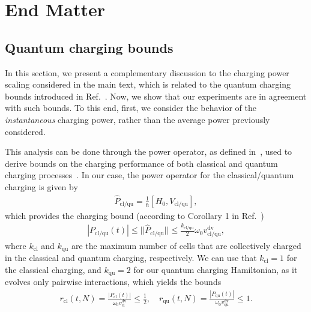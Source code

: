 \documentclass[aps,prl,epsfigure,twocolumn,superscriptaddress]{revtex4-2}
\newcommand{\1}{\mathbbm{1}}
\begin{document}
	\section*{End Matter}



	\subsection{Quantum charging bounds}

	In this section, we present a complementary discussion to the charging power scaling considered in the main text, which is related to the quantum charging bounds introduced in Ref.~\cite{Kim:22}. Now, we show that our experiments are in agreement with such bounds. To this end, first, we consider the behavior of the \textit{instantaneous} charging power, rather than the average power previously considered.

	This analysis can be done through the power operator, as defined in~\cite{Santos:20c}, used to derive bounds on the charging performance of both classical and quantum charging processes~\cite{Kim:22}. In our case, the power operator for the classical/quantum charging is given by
	\begin{align}
		\hat{P}_{\mathrm{cl}/\mathrm{qu}} = \frac{1}{\hbar} [H_{0},V_{\mathrm{cl}/\mathrm{qu}}]  ,
	\end{align}
	which provides the charging bound (according to Corollary 1 in Ref.~\cite{Kim:22})
	\begin{align}
		| P_{\mathrm{cl}/\mathrm{qu}} (t) | \leq ||\hat{P}_{\mathrm{cl}/\mathrm{qu}}|| \le \frac{k_{\mathrm{cl}/\mathrm{qu}}}{2} \omega_0 v^{ \text{dv}}_{\mathrm{cl}/\mathrm{qu}} , \label{Eq:Ineq}
	\end{align}
	where $k_{\mathrm{cl}}$ and $k_{\mathrm{qu}}$ are the maximum number of cells that are collectively charged in the classical and quantum charging, respectively. We can use that $k_{\mathrm{cl}}=1$ for the classical charging, and $k_{\mathrm{qu}}=2$ for our quantum charging Hamiltonian, as it evolves only pairwise interactions, which yields the bounds
	\begin{align}
		r_{\mathrm{cl}}(t,N) = \frac{| P_{\mathrm{cl}} (t) |}{ \omega_0 v^{ \text{dv}}_{\mathrm{cl}}} \leq \frac{1}{2} ,
		\quad
		r_{\mathrm{qu}}(t,N) =  \frac{| P_{\mathrm{qu}} (t) |}{ \omega_0 v^{ \text{dv}}_{\mathrm{qu}}} \leq 1 . \label{Eq:Bounds}
	\end{align}
\end{document}
